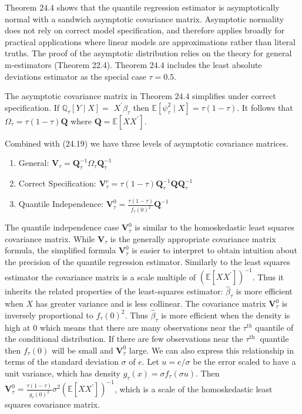 \documentclass[10pt]{article}
\begin{document}
Theorem $24.4$ shows that the quantile regression estimator is asymptotically normal with a sandwich asymptotic covariance matrix. Asymptotic normality does not rely on correct model specification, and therefore applies broadly for practical applications where linear models are approximations rather than literal truths. The proof of the asymptotic distribution relies on the theory for general m-estimators (Theorem 22.4). Theorem $24.4$ includes the least absolute deviations estimator as the special case $\tau=0.5$.

The asymptotic covariance matrix in Theorem $24.4$ simplifies under correct specification. If $\mathbb{Q}_{\tau}[Y \mid X]=$ $X^{\prime} \beta_{\tau}$ then $\mathbb{E}\left[\psi_{\tau}^{2} \mid X\right]=\tau(1-\tau)$. It follows that $\Omega_{\tau}=\tau(1-\tau) \boldsymbol{Q}$ where $\boldsymbol{Q}=\mathbb{E}\left[X X^{\prime}\right]$.

Combined with (24.19) we have three levels of asymptotic covariance matrices.

\begin{enumerate}
  \item General: $\boldsymbol{V}_{\tau}=\boldsymbol{Q}_{\tau}^{-1} \Omega_{\tau} \boldsymbol{Q}_{\tau}^{-1}$

  \item Correct Specification: $\boldsymbol{V}_{\tau}^{c}=\tau(1-\tau) \boldsymbol{Q}_{\tau}^{-1} \boldsymbol{Q} \boldsymbol{Q}_{\tau}^{-1}$

  \item Quantile Independence: $\boldsymbol{V}_{\tau}^{0}=\frac{\tau(1-\tau)}{f_{\tau}(0)^{2}} \boldsymbol{Q}^{-1}$

\end{enumerate}
The quantile independence case $\boldsymbol{V}_{\tau}^{0}$ is similar to the homoskedastic least squares covariance matrix. While $\boldsymbol{V}_{\tau}$ is the generally appropriate covariance matrix formula, the simplified formula $\boldsymbol{V}_{\tau}^{0}$ is easier to interpret to obtain intuition about the precision of the quantile regression estimator. Similarly to the least squares estimator the covariance matrix is a scale multiple of $\left(\mathbb{E}\left[X X^{\prime}\right]\right)^{-1}$. Thus it inherits the related properties of the least-squares estimator: $\widehat{\beta}_{\tau}$ is more efficient when $X$ has greater variance and is less collinear. The covariance matrix $\boldsymbol{V}_{\tau}^{0}$ is inversely proportional to $f_{\tau}(0)^{2}$. Thus $\widehat{\beta}_{\tau}$ is more efficient when the density is high at 0 which means that there are many observations near the $\tau^{t h}$ quantile of the conditional distribution. If there are few observations near the $\tau^{\text {th }}$ quantile then $f_{\tau}(0)$ will be small and $\boldsymbol{V}_{\tau}^{0}$ large. We can also express this relationship in terms of the standard deviation $\sigma$ of $e$. Let $u=e / \sigma$ be the error scaled to have a unit variance, which has density $g_{\tau}(x)=\sigma f_{\tau}(\sigma u)$. Then $\boldsymbol{V}_{\tau}^{0}=\frac{\tau(1-\tau)}{g_{\tau}(0)^{2}} \sigma^{2}\left(\mathbb{E}\left[X X^{\prime}\right]\right)^{-1}$, which is a scale of the homoskedastic least squares covariance matrix.
\end{document}
